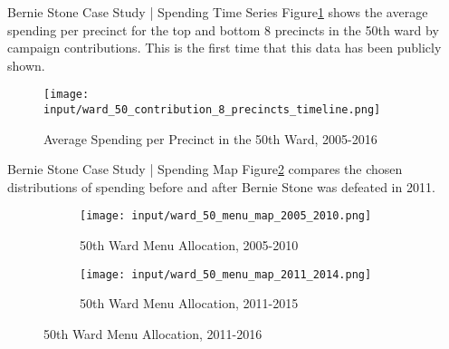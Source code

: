 \begin{frame}{Bernie Stone Case Study | Spending Time Series}
Figure\ref{fig:stone_spending_timeline} shows the average spending per precinct for the top and bottom 8 precincts in the 50th ward by campaign contributions.
This is the first time that this data has been publicly shown.
    \begin{figure}[H]
        \centering
        \texttt{[image: input/ward\_50\_contribution\_8\_precincts\_timeline.png]}
        \caption{Average Spending per Precinct in the 50th Ward, 2005-2016}
        \label{fig:stone_spending_timeline}
    \end{figure}
\end{frame}

\begin{frame}{Bernie Stone Case Study | Spending Map}
Figure\ref{fig:stone_menu_maps} compares the chosen distributions of spending before and after Bernie Stone was defeated in 2011.
    \begin{figure}[H]
        \centering
        \begin{subfigure}[b]{0.3\textwidth} %
        \texttt{[image: input/ward\_50\_menu\_map\_2005\_2010.png]}
        \caption{50th Ward Menu Allocation, 2005-2010}
        \end{subfigure}
        \begin{subfigure}[b]{0.3\textwidth}
        \texttt{[image: input/ward\_50\_menu\_map\_2011\_2014.png]}
        \caption{50th Ward Menu Allocation, 2011-2015}
        \end{subfigure}
        \caption{50th Ward Menu Allocation, 2011-2016}
        \label{fig:stone_menu_maps}
    \end{figure}
\end{frame}
